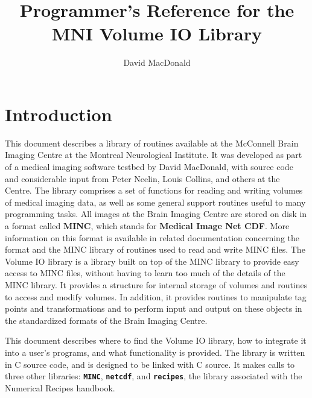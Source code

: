 
\title{Programmer's Reference for the MNI Volume IO Library}
\author{David MacDonald}

\newcommand{\path}{{\bf\tt /nil/david/Release/MNI\_lib}}
\newcommand{\name}[1]{{\bf\tt #1}}

\newcommand{\desc}[1]{\begin{tabular}{p{2cm}p{10cm}}
& #1 \end{tabular}}



\maketitle

\newpage

\tableofcontents

\newpage

\chapter{Introduction}

This document describes a library of routines available at the
McConnell Brain Imaging Centre at the Montreal Neurological Institute.
It was developed as part of a medical imaging software testbed by
David MacDonald, with source code and considerable input from Peter
Neelin, Louis Collins, and others at the Centre.
The library comprises a set of functions for reading and writing
volumes of medical imaging data, as well as some general support
routines useful to many programming tasks.  All images at the Brain
Imaging Centre are stored on disk in a format called {\bf MINC}, which
stands for {\bf Medical Image Net CDF}.  More information on this
format is available in related documentation concerning the format and
the MINC library of routines used to read and write MINC files.  The
Volume IO library is a library built on top of the MINC library to
provide easy access to MINC files, without having to learn too much of
the details of the MINC library.  It provides a structure for internal
storage of volumes and routines to access and modify volumes.  In
addition, it provides routines to manipulate tag points and
transformations and to perform input and output on these objects in
the standardized formats of the Brain Imaging Centre.

This document describes where to find the Volume IO library, how to
integrate it into a user's programs, and what functionality
is provided.  The library is written in C source code, and is designed
to be linked with C source.  It makes calls to three other libraries:
\name{MINC}, \name{netcdf}, and \name{recipes}, the library associated
with the Numerical Recipes handbook.

